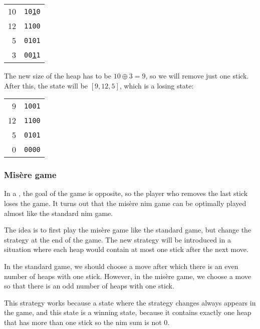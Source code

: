 \begin{center}
    \begin{tabular}{r|r}
        10 & \texttt{10\underline{1}0} \\
        12 & \texttt{1100}             \\
        5  & \texttt{0101}             \\
        \hline
        3  & \texttt{00\underline{1}1} \\
    \end{tabular}
\end{center}

The new size of the heap has to be
$10 \oplus 3 = 9$,
so we will remove just one stick.
After this, the state will be $[9,12,5]$,
which is a losing state:

\begin{center}
    \begin{tabular}{r|r}
        9  & \texttt{1001} \\
        12 & \texttt{1100} \\
        5  & \texttt{0101} \\
        \hline
        0  & \texttt{0000} \\
    \end{tabular}
\end{center}

\subsubsection{Misère game}


In a , the goal of the game
is opposite,
so the player who removes the last stick
loses the game.
It turns out that the misère nim game can be
optimally played almost like the standard nim game.

The idea is to first play the misère game
like the standard game, but change the strategy
at the end of the game.
The new strategy will be introduced in a situation
where each heap would contain at most one stick
after the next move.

In the standard game, we should choose a move
after which there is an even number of heaps with one stick.
However, in the misère game, we choose a move so that
there is an odd number of heaps with one stick.

This strategy works because a state where the
strategy changes always appears in the game,
and this state is a winning state, because
it contains exactly one heap that has more than one stick
so the nim sum is not 0.

